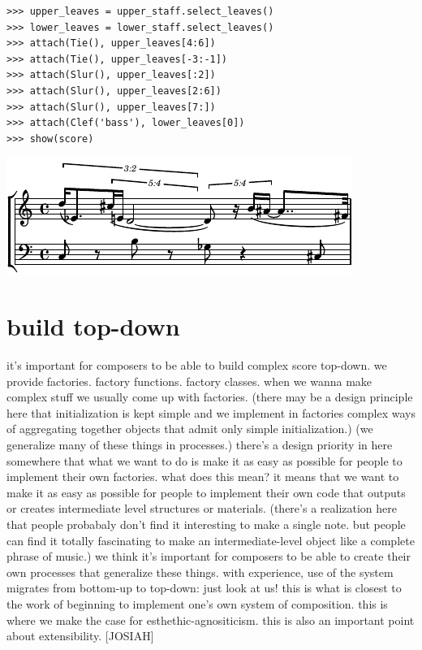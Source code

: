 \documentclass{article}
\begin{document}
\begin{lstlisting}
>>> upper_leaves = upper_staff.select_leaves()
>>> lower_leaves = lower_staff.select_leaves()
>>> attach(Tie(), upper_leaves[4:6])
>>> attach(Tie(), upper_leaves[-3:-1])
>>> attach(Slur(), upper_leaves[:2])
>>> attach(Slur(), upper_leaves[2:6])
>>> attach(Slur(), upper_leaves[7:])
>>> attach(Clef('bass'), lower_leaves[0])
>>> show(score)
\end{lstlisting}

\includegraphics[scale=1.0]{images/abjad-2.pdf}


\section{build top-down}

it's important for composers to be able to build complex
score top-down. we provide factories. factory functions. factory classes. when
we wanna make complex stuff we usually come up with factories. (there may be a
design principle here that initialization is kept simple and we implement in
factories complex ways of aggregating together objects that admit only simple
initialization.) (we generalize many of these things in processes.) there's a
design priority in here somewhere that what we want to do is make it as easy as
possible for people to implement their own factories. what does this mean? it
means that we want to make it as easy as possible for people to implement their
own code that outputs or creates intermediate level structures or materials.
(there's a realization here that people probabaly don't find it interesting to
make a single note. but people can find it totally fascinating to make an
intermediate-level object like a complete phrase of music.) we think it's
important for composers to be able to create their own processes that
generalize these things. with experience, use of the system migrates from
bottom-up to top-down: just look at us! this is what is closest to the work of
beginning to implement one's own system of composition. this is where we make
the case for esthethic-agnositicism. this is also an important point about
extensibility. [JOSIAH]
\end{document}

